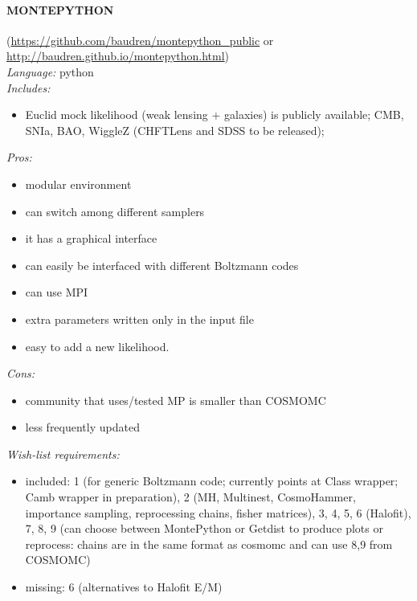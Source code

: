 \paragraph{MONTEPYTHON}(\url{https://github.com/baudren/montepython_public} or \url{http://baudren.github.io/montepython.html})\\
{\it Language:} python\\
{\it Includes:}
\begin{itemize}
 \item Euclid mock likelihood (weak lensing + galaxies) is publicly available; CMB, SNIa, BAO, WiggleZ (CHFTLens and SDSS to be released); 
\end{itemize}
{\it Pros: }
\begin{itemize}
 \item modular environment
 \item can switch among different samplers
 \item it has a graphical interface
 \item can easily be interfaced with different Boltzmann codes
 \item can use MPI
 \item extra parameters written only in the input file
 \item easy to add a new likelihood.
\end{itemize}
{\it Cons:} 
\begin{itemize}
 \item community that uses/tested MP is smaller than COSMOMC
 \item less frequently updated 
\end{itemize}
{\it Wish-list requirements: }
\begin{itemize}
 \item included: 1 (for generic Boltzmann code; currently points at Class wrapper; Camb wrapper in preparation), 2 (MH, Multinest, CosmoHammer, importance sampling, reprocessing chains, fisher matrices), 3, 4, 5, 6 (Halofit), 7, 8, 9 (can choose between MontePython or Getdist to produce plots or reprocess: chains are in the same format as cosmomc and can use 8,9 from COSMOMC) 
 \item missing: 6 (alternatives to Halofit E/M) 
\end{itemize}

